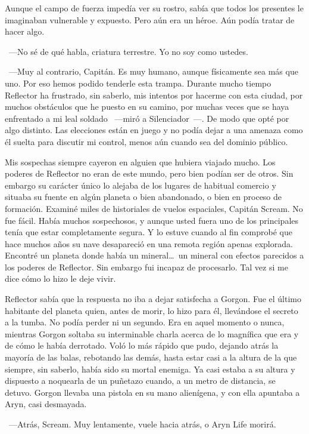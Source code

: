 Aunque el campo de fuerza impedía ver su rostro, sabía que todos los presentes le imaginaban vulnerable y expuesto. Pero aún era un héroe. Aún podía tratar de hacer algo.

~---No sé de qué habla, criatura terrestre. Yo no soy como ustedes.

~---Muy al contrario, Capitán. Es muy humano, aunque físicamente sea más que uno. Por eso hemos podido tenderle esta trampa. Durante mucho tiempo Reflector ha frustrado, sin saberlo, mis intentos por hacerme con esta ciudad, por muchos obstáculos que he puesto en su camino, por muchas veces que se haya enfrentado a mi leal soldado ~---miró a Silenciador~---. De modo que opté por algo distinto. Las elecciones están en juego y no podía dejar a una amenaza como él suelta para discutir mi control, menos aún cuando sea del dominio público.

\rquoti Mis sospechas siempre cayeron en alguien que hubiera viajado mucho. Los poderes de Reflector no eran de este mundo, pero bien podían ser de otros. Sin embargo su carácter único lo alejaba de los lugares de habitual comercio y situaba su fuente en algún planeta o bien abandonado, o bien en proceso de formación. Examiné miles de historiales de vuelos espaciales, Capitán Scream. No fue fácil. Había muchos sospechosos, y aunque usted fuera uno de los principales tenía que estar completamente segura. Y lo estuve cuando al fin comprobé que hace muchos años su nave desapareció en una remota región apenas explorada. Encontré un planeta donde había un mineral\dots\ un mineral con efectos parecidos a los poderes de Reflector. Sin embargo fui incapaz de procesarlo. Tal vez si me dice cómo lo hizo le deje vivir.

Reflector sabía que la respuesta no iba a dejar satisfecha a Gorgon. Fue el último habitante del planeta quien, antes de morir, lo hizo para él, llevándose el secreto a la tumba. No podía perder ni un segundo. Era en aquel momento o nunca, mientras Gorgon soltaba su interminable charla acerca de lo magnífica que era y de cómo le había derrotado. Voló lo más rápido que pudo, dejando atrás la mayoría de las balas, rebotando las demás, hasta estar casi a la altura de la que siempre, sin saberlo, había sido su mortal enemiga. Ya casi estaba a su altura y dispuesto a noquearla de un puñetazo cuando, a un metro de distancia, se detuvo. Gorgon llevaba una pistola en su mano alienígena, y con ella apuntaba a Aryn, casi desmayada.

~---Atrás, Scream. Muy lentamente, vuele hacia atrás, o Aryn Life morirá.

